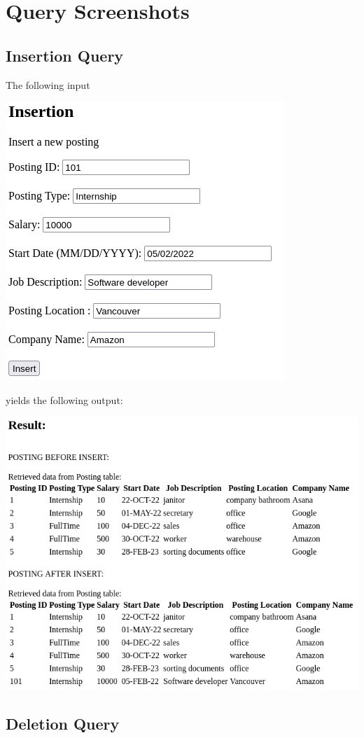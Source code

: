 \section{Query Screenshots}

\subsection{Insertion Query}

The following input

\includegraphics[width=0.5\linewidth]{src/6/2022-03-30-173959_399x398_scrot.png}

yields the following output:

\includegraphics[width=\linewidth]{src/6/2022-03-30-174009_684x529_scrot.png}

\newpage

\subsection{Deletion Query}


